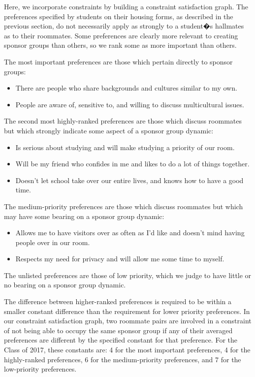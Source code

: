 \documentclass[letterpaper]{article}
\begin{document}
Here, we incorporate constraints by building a constraint satisfaction graph. The preferences specified by students on their housing forms, as described in the previous section, do not necessarily apply as strongly to a student�s hallmates as to their roommates. Some preferences are clearly more relevant to creating sponsor groups than others, so we rank some as more important than others.

The most important preferences are those which pertain directly to sponsor groups:

\begin{itemize}
\item There are people who share backgrounds and cultures similar to my own.
\item People are aware of, sensitive to, and willing to discuss multicultural issues.
\end{itemize}

The second most highly-ranked preferences are those which discuss roommates but which strongly indicate some aspect of a sponsor group dynamic:


\begin{itemize}
\item Is serious about studying and will make studying a priority of our room.
\item Will be my friend who confides in me and likes to do a lot of things together.
\item Doesn't let school take over our entire lives, and knows how to have a good time.
\end{itemize}

The medium-priority preferences are those which discuss roommates but which may have some bearing on a sponsor group dynamic:

\begin{itemize}
\item Allows me to have visitors over as often as I'd like and doesn't mind having people over in our room.
\item Respects my need for privacy and will allow me some time to myself.
\end{itemize}

The unlisted preferences are those of low priority, which we judge to have little or no bearing on a sponsor group dynamic.

The difference between higher-ranked preferences is required to be within a smaller constant difference than the requirement for lower priority preferences. In our constraint satisfaction graph, two roommate pairs are involved in a constraint of not being able to occupy the same sponsor group if any of their averaged preferences are different by the specified constant for that preference. For the Class of 2017, these constants are: 4 for the most important preferences, 4 for the highly-ranked preferences, 6 for the medium-priority preferences, and 7 for the low-priority preferences.
\end{document}
